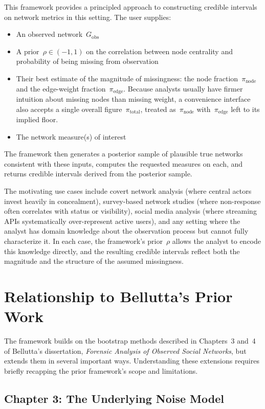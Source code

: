 \documentclass[11pt]{article}
\newcommand{\Gobs}{G_{\text{obs}}}
\newcommand{\pinode}{\pi_{\text{node}}}
\newcommand{\piedge}{\pi_{\text{edge}}}
\newcommand{\pitotal}{\pi_{\text{total}}}
\begin{document}
This framework provides a principled approach to constructing credible intervals on network metrics in this setting. The user supplies:
\begin{itemize}[leftmargin=*, itemsep=2pt]
  \item An observed network~$\Gobs$
  \item A prior~$\rho \in (-1, 1)$ on the correlation between node centrality and probability of being missing from observation
  \item Their best estimate of the magnitude of missingness: the node fraction~$\pinode$ and the edge-weight fraction~$\piedge$. Because analysts usually have firmer intuition about missing nodes than missing weight, a convenience interface also accepts a single overall figure~$\pitotal$, treated as~$\pinode$ with~$\piedge$ left to its implied floor.
  \item The network measure(s) of interest
\end{itemize}
The framework then generates a posterior sample of plausible true networks consistent with these inputs, computes the requested measures on each, and returns credible intervals derived from the posterior sample.

The motivating use cases include covert network analysis (where central actors invest heavily in concealment), survey-based network studies (where non-response often correlates with status or visibility), social media analysis (where streaming APIs systematically over-represent active users), and any setting where the analyst has domain knowledge about the observation process but cannot fully characterize it. In each case, the framework's prior~$\rho$ allows the analyst to encode this knowledge directly, and the resulting credible intervals reflect both the magnitude and the structure of the assumed missingness.

\section{Relationship to Bellutta's Prior Work}

The framework builds on the bootstrap methods described in Chapters~3 and~4 of Bellutta's dissertation, \emph{Forensic Analysis of Observed Social Networks}, but extends them in several important ways. Understanding these extensions requires briefly recapping the prior framework's scope and limitations.

\subsection{Chapter 3: The Underlying Noise Model}
\end{document}
